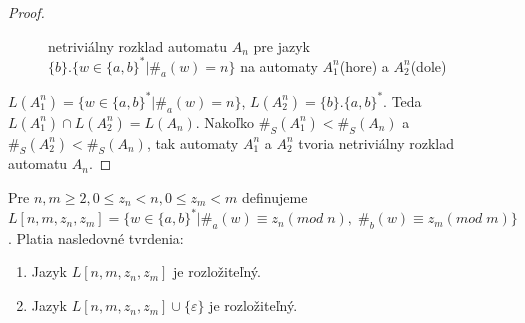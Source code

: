 \begin{proof}
\begin{figure}[H]
\caption{netriviálny rozklad automatu $ A_n $ pre jazyk $ \lbrace b \rbrace.\lbrace w \in \lbrace a,b \rbrace^{*} | \#_a(w)=n \rbrace $ na automaty $ A_1^n $(hore) a $ A_2^n $(dole)}
\label{fig:dec_ba^n}
\end{figure}

$ L(A_1^n) = \lbrace w \in \lbrace a,b \rbrace^{*} | \#_{a}(w) = n \rbrace $, $ L(A_2^n) = \lbrace b \rbrace.\lbrace a,b \rbrace^{*} $. Teda $ L(A_1^n) \cap L(A_2^n) = L(A_n) $.  Nakoľko $ \#_{S}(A_1^n) < \#_{S}(A_n) $ a $ \#_{S}(A_2^n) < \#_{S}(A_n) $, tak automaty $ A_1^n $ a $ A_2^n $ tvoria netriviálny rozklad automatu $ A_n $.
\end{proof}

\begin{proposition}
\label{thm:nmz_nz_m}
Pre $ n,m \geq 2, 0 \leq z_n < n, 0 \leq z_m < m $ definujeme $ L[n,m,z_n,z_m] = \lbrace w \in \lbrace a,b \rbrace^{*} | \#_a(w) \equiv z_n (mod \; n), \; \#_b(w) \equiv z_m (mod \; m) \rbrace $. Platia nasledovné tvrdenia:
\begin{enumerate}[label=(\alph*)]
\item \label{thm:nmz_nz_m_item_1} Jazyk $ L[n,m,z_n,z_m] $ je rozložiteľný.
\item \label{thm:nmz_nz_m_item_2} Jazyk $ L[n,m,z_n,z_m] \cup \lbrace \varepsilon \rbrace $ je rozložiteľný.
\end{enumerate}
\end{proposition}

